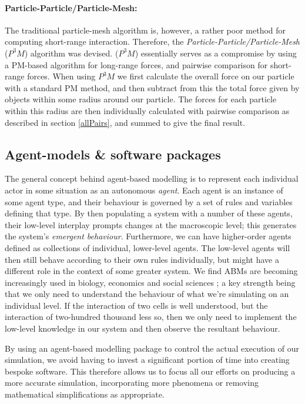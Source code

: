 \documentclass[11pt,a4paper]{article}
\begin{document}
\paragraph{Particle-Particle/Particle-Mesh:}
The traditional particle-mesh algorithm is, however, a rather poor method\cite{nbodyAlg} for computing short-range interaction. Therefore, the \emph{Particle-Particle/Particle-Mesh} ($P^3M$) algorithm was devised. ($P^3M$) essentially serves as a compromise by using a PM-based algorithm for long-range forces, and pairwise comparison for short-range forces. When using $P^3M$ we first calculate the overall force on our particle with a standard PM method, and then subtract from this the total force given by objects within some radius around our particle. The forces for each particle within this radius are then individually calculated with pairwise comparison as described in section \ref{allPairs}, and summed to give the final result.

\subsection{Agent-models \& software packages}
\label{potentialSoftware}

The general concept behind agent-based modelling is to represent each individual actor in some situation as an autonomous \emph{agent}. Each agent is an instance of some agent type, and their behaviour is governed by a set of rules and variables defining that type. By then populating a system with a number of these agents, their low-level interplay prompts changes at the macroscopic level; this generates the system's \emph{emergent behaviour}. Furthermore, we can have higher-order agents defined as collections of individual, lower-level agents. The low-level agents will then still behave according to their own rules individually, but might have a different role in the context of some greater system. We find ABMs are becoming increasingly used in biology, economics and social sciences \cite{abmPresentation}; a key strength being that we only need to understand the behaviour of what we're simulating on an individual level. If the interaction of two cells is well understood, but the interaction of two-hundred thousand less so, then we only need to implement the low-level knowledge in our system and then observe the resultant behaviour.

By using an agent-based modelling package to control the actual execution of our simulation, we avoid having to invest a significant portion of time into creating bespoke software. This therefore allows us to focus all our efforts on producing a more accurate simulation, incorporating more phenomena or removing mathematical simplifications as appropriate.
\end{document}
